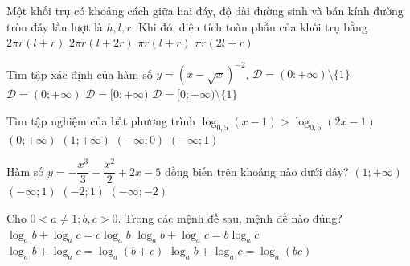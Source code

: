 \begin{ex}%
	Một khối trụ có khoảng cách giữa hai đáy, độ dài đường sinh và bán kính đường tròn đáy lần lượt là $h, l, r$. Khi đó, diện tích toàn phần của khối trụ bằng
	\choice
	{\True $2\pi r(l+r)$}
	{$2\pi r(l+2r)$}
	{$\pi r(l+r)$}
	{$\pi r(2l+r)$}
\end{ex}


\begin{ex}%
	Tìm tập xác định của hàm số $y=\left(x-\sqrt{x}\right)^{-2}$.
	\choice
	{\True $\mathscr{D}=(0:+\infty)\setminus \lbrace1\rbrace$}
	{$\mathscr{D}=(0;+\infty)$}
	{$\mathscr{D}=[0;+\infty)$}
	{$\mathscr{D}=[0;+\infty)\setminus \lbrace1\rbrace$}
\end{ex}

\begin{ex}%
	Tìm tập nghiệm của bất phương trình $\log_{0,5}(x-1)>\log_{0,5}(2x-1)$
	\choice
	{$(0;+\infty)$}
	{\True $(1;+\infty)$}
	{$(-\infty; 0)$}
	{$(-\infty; 1)$}
\end{ex}


\begin{ex}%
	Hàm số $y=-\dfrac{x^3}{3}-\dfrac{x^2}{2}+2x-5$ đồng biến trên khoảng nào dưới đây?
	\choice
	{$(1; +\infty)$}
	{$(-\infty; 1)$}
	{\True $(-2; 1)$}
	{$(-\infty; -2)$}
\end{ex}


\begin{ex}%
	Cho $0<a\neq 1; b, c>0$. Trong các mệnh đề sau, mệnh đề nào đúng?
	\choice
	{$\log_ab+\log_ac=c\log_ab$}
	{$\log_ab+\log_ac=b\log_ac$}
	{$\log_ab+\log_ac=\log_a(b+c)$}
	{\True $\log_ab+\log_ac=\log_a(bc)$}
\end{ex}


